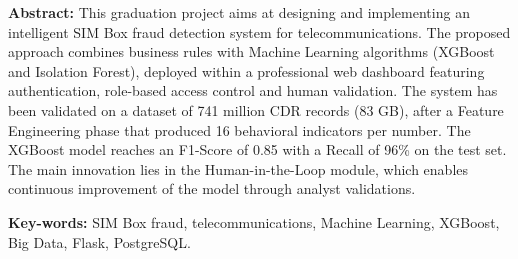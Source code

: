 \documentclass[12pt, oneside, a4paper]{report}
\begin{document}
\vspace{1em}

\textbf{Abstract:} This graduation project aims at designing and implementing an intelligent SIM Box fraud detection system for telecommunications. The proposed approach combines business rules with Machine Learning algorithms (XGBoost and Isolation Forest), deployed within a professional web dashboard featuring authentication, role-based access control and human validation. The system has been validated on a dataset of 741 million CDR records (83 GB), after a Feature Engineering phase that produced 16 behavioral indicators per number. The XGBoost model reaches an F1-Score of 0.85 with a Recall of 96\% on the test set. The main innovation lies in the Human-in-the-Loop module, which enables continuous improvement of the model through analyst validations.

\textbf{Key-words:} SIM Box fraud, telecommunications, Machine Learning, XGBoost, Big Data, Flask, PostgreSQL.
\end{document}
